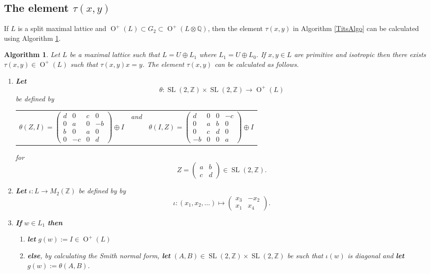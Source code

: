 \documentclass[12pt, a4paper]{article}
\newtheorem{algo}{Algorithm}[section]
\newcommand{\ZZ}{\mathbb{Z}}
\newcommand{\QQ}{\mathbb{Q}}
\newcommand{\beq}{\begin{equation*}}
\newcommand{\eeq}{\end{equation*}}
\newcommand{\opn}{\operatorname}
\newcommand{\op}{\oplus}
\newcommand{\bpm}{\begin{pmatrix}}
\newcommand{\epm}{\end{pmatrix}}
\begin{document}
\subsection{The element $\tau(x,y)$}
If $L$ is a split maximal lattice and $\opn{O}^+(L) \subset G_2 \subset \opn{O}^+(L \otimes \QQ)$, then the element $\tau(x,y)$ in Algorithm \ref{TitsAlgo} can be calculated using Algorithm \ref{EichlerAlg}.
\begin{algo}\label{EichlerAlg}
  Let $L$ be a maximal lattice such that $L=U \op L_1$ where $L_1 = U \op L_0$.
  If $x, y \in L$ are primitive and isotropic then there exists $\tau(x,y) \in \opn{O}^+(L)$ such that $\tau(x,y) x = y$.
  The element $\tau(x,y)$ can be calculated as follows.
  \begin{enumerate}
  \item \textbf{Let} \label{eichler1}
\begin{equation}\label{SL2emb}
    \theta:\opn{SL}(2, \ZZ) \times \opn{SL}(2, \ZZ) \rightarrow \opn{O}^+(L)
    \end{equation}
    be defined by
    \begin{center}
      \begin{tabular}{c c c  }
        $\theta(Z, I) =
        \bpm
        d & 0 & c & 0 \\
        0 & a & 0 & -b \\
        b & 0 & a & 0 \\
        0 & -c & 0 & d
        \epm \op I$
        & and &
        $\theta(I, Z)=
        \bpm
        d & 0 & 0 & -c \\
        0 & a & b & 0 \\
        0 & c & d & 0 \\
        -b & 0 & 0 & a 
        \epm
        \op I$
      \end{tabular}
    \end{center}
    for 
    \beq
    Z = \bpm a & b \\ c & d \epm \in \opn{SL}(2, \ZZ).
    \eeq
  \item \textbf{Let} $\iota: L \rightarrow M_2(\ZZ)$ be defined by by \label{eichler2}
    \beq
    \iota: (x_1, x_2, \ldots ) \mapsto
    \bpm
    x_3 & -x_2 \\
    x_1 & x_4
    \epm.
    \eeq
\item   \textbf{If}  $w \in L_1$ \textbf{then}  
    \label{eichler3}
    \begin{enumerate}
    \item[]  \textbf{let} $g(w):=I \in \opn{O}^+(L)$
    \item[] \textbf{else}, by calculating the Smith normal form, \textbf{let} $(A, B) \in \opn{SL}(2, \ZZ) \times \opn{SL}(2, \ZZ)$ be such that $\iota(w)$ is diagonal and \textbf{let} $g(w):=\theta(A, B)$.

\end{enumerate}
\end{enumerate}
\end{algo}
\end{document}
